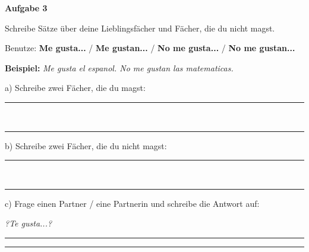 \documentclass[11pt, a4paper]{article}
\newcommand{\fachfarbe}{spanisch}
\newcommand{\punktebox}[1]{\hfill\fbox{\small \_/#1}}
\newcommand{\luecke}[1]{\rule{#1}{0.4pt}}
\newenvironment{aufgabe}[1]{%
    \needspace{5\baselineskip}%
    \nopagebreak[4]%
    \vspace{10pt}
    \noindent\textbf{\textcolor{\fachfarbe}{Aufgabe #1}}
    \nopagebreak[4]%
    \vspace{5pt}
    \nopagebreak[4]%
    \begin{list}{}{\leftmargin=0pt}
    \item[]
}{%
    \end{list}
}
\newcommand{\es}[1]{\textcolor{\fachfarbe}{\textbf{#1}}}
\begin{document}
\vspace{15pt}


\begin{aufgabe}{3}
Schreibe Sätze über deine Lieblingsfächer und Fächer, die du nicht magst. \punktebox{6}
\end{aufgabe}

\begin{hinweis}
Benutze: \es{Me gusta...} / \es{Me gustan...} / \es{No me gusta...} / \es{No me gustan...}
\end{hinweis}

\vspace{0.5em}

\noindent
\textbf{Beispiel:} \textit{Me gusta el espanol. No me gustan las matematicas.}

\vspace{0.5em}

\noindent
a) Schreibe zwei Fächer, die du magst:

\vspace{0.3em}
\noindent\rule{\textwidth}{0.4pt}\\[0.5em]
\noindent\rule{\textwidth}{0.4pt}

\vspace{0.8em}

\noindent
b) Schreibe zwei Fächer, die du nicht magst:

\vspace{0.3em}
\noindent\rule{\textwidth}{0.4pt}\\[0.5em]
\noindent\rule{\textwidth}{0.4pt}

\vspace{0.8em}

\noindent
c) Frage einen Partner / eine Partnerin und schreibe die Antwort auf:

\vspace{0.3em}
\noindent
\textit{?Te gusta...?} \luecke{10cm}

\vspace{0.3em}
\noindent\rule{\textwidth}{0.4pt}

\vspace{15pt}

\end{document}
